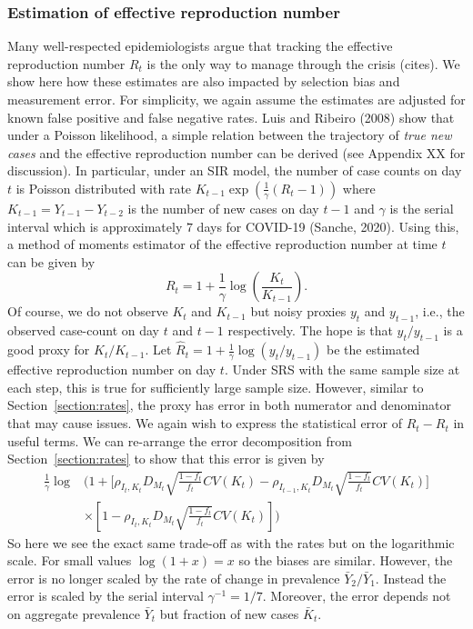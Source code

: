 \documentclass[11pt]{amsart}
\begin{document}
\subsubsection{Estimation of effective reproduction number}
Many well-respected epidemiologists argue that tracking the effective reproduction number $R_t$ is the only way to manage through the crisis (cites).  We show here how these estimates are also impacted by selection bias and measurement error.  For simplicity, we again assume the estimates are adjusted for known false positive and false negative rates. Luis and Ribeiro (2008) show that under a Poisson likelihood, a simple relation between the trajectory of \emph{true new cases} and the effective reproduction number can be derived (see Appendix XX for discussion).  In particular, under an SIR model, the number of case counts on day $t$ is Poisson distributed with rate $K_{t-1} \exp \left( \frac{1}{\gamma} (R_t - 1) \right)$ where $K_{t-1} = Y_{t-1}-Y_{t-2}$ is the number of new cases on day $t-1$ and $\gamma$ is the serial interval which is approximately $7$ days for COVID-19 (Sanche, 2020).  Using this, a method of moments estimator of the effective reproduction number at time $t$ can be given by
$$
R_t = 1 + \frac{1}{\gamma} \log \left( \frac{K_t}{K_{t-1}} \right).
$$
Of course, we do not observe $K_t$ and $K_{t-1}$ but noisy proxies $y_t$ and $y_{t-1}$, i.e., the observed case-count on day $t$ and $t-1$ respectively. The hope is that $y_t/y_{t-1}$ is a good proxy for $K_t/K_{t-1}$. Let $\hat R_t = 1 + \frac{1}{\gamma} \log \left( y_t / y_{t-1} \right)$ be the estimated effective reproduction number on day $t$.  Under SRS with the same sample size at each step, this is true for sufficiently large sample size.  However, similar to Section~\ref{section:rates}, the proxy has error in both numerator and denominator that may cause issues.  We again wish to express the statistical error of $\hat R_t - R_t$ in useful terms.  We can re-arrange the error decomposition from Section~\ref{section:rates} to show that this error is given by
$$
\begin{aligned}
\frac{1}{\gamma}\log &\bigg( 1 + \bigg[ \rho_{I_t,K_t} D_{M_t} \sqrt{\frac{1-f_t}{f_t}} CV (K_t)  -\rho_{I_{t-1},K_t} D_{M_t} \sqrt{\frac{1-f_t}{f_t}} CV (K_t) \bigg] \\
&\times \left[ 1 - \rho_{I_t,K_t} D_{M_t} \sqrt{\frac{1-f_t}{f_t}} CV (K_t) \right] \bigg)
\end{aligned}
$$
So here we see the exact same trade-off as with the rates but on the logarithmic scale.  For small values $\log(1+x) = x$ so the biases are similar.  However, the error is no longer scaled by the rate of change in prevalence $\bar Y_2/\bar Y_1$. Instead the error is scaled by the serial interval $\gamma^{-1} = 1/7$.  Moreover, the error depends not on aggregate prevalence $\bar Y_t$ but fraction of new cases $\bar K_t$.
\end{document}
